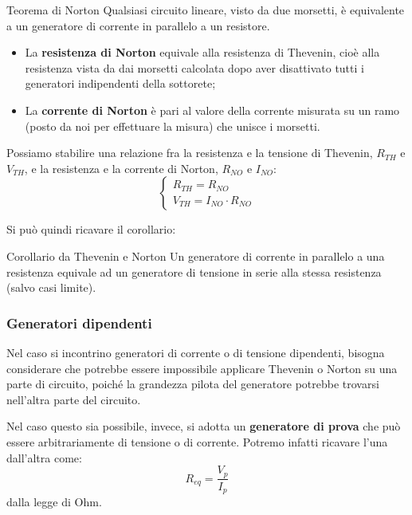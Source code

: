 \documentclass[a4paper,11pt]{article}
\begin{document}
\begin{theorem}{Teorema di Norton}
	Qualsiasi circuito lineare, visto da due morsetti, è equivalente a un generatore di corrente in parallelo a un resistore.

\begin{itemize}
	\item La \textbf{resistenza di Norton} equivale alla resistenza di Thevenin, cioè alla resistenza vista da dai morsetti calcolata dopo aver disattivato tutti i generatori indipendenti della sottorete;
	\item La \textbf{corrente di Norton} è pari al valore della corrente misurata su un ramo (posto da noi per effettuare la misura) che unisce i morsetti.\end{itemize}
\end{theorem}

\par\medskip 

Possiamo stabilire una relazione fra la resistenza e la tensione di Thevenin, $R_{TH}$ e $V_{TH}$, e la resistenza e la corrente di Norton, $R_{NO}$ e $I_{NO}$:
\[
	\begin{cases}
		R_{TH} = R_{NO} \\ 
		V_{TH} = I_{NO} \cdot R_{NO}
	\end{cases}
\]

Si può quindi ricavare il corollario:
\begin{theorem}{Corollario da Thevenin e Norton}
	Un generatore di corrente in parallelo a una resistenza equivale ad un generatore di tensione in serie alla stessa resistenza (salvo casi limite).
\end{theorem}

\par\medskip 

\subsubsection{Generatori dipendenti}
Nel caso si incontrino generatori di corrente o di tensione dipendenti, bisogna considerare che potrebbe essere impossibile applicare Thevenin o Norton su una parte di circuito, poiché la grandezza pilota del generatore potrebbe trovarsi nell'altra parte del circuito.

Nel caso questo sia possibile, invece, si adotta un \textbf{generatore di prova} che può essere arbitrariamente di tensione o di corrente.
Potremo infatti ricavare l'una dall'altra come:
$$
R_{eq} = \frac{V_p}{I_p}
$$
dalla legge di Ohm.
\end{document}
